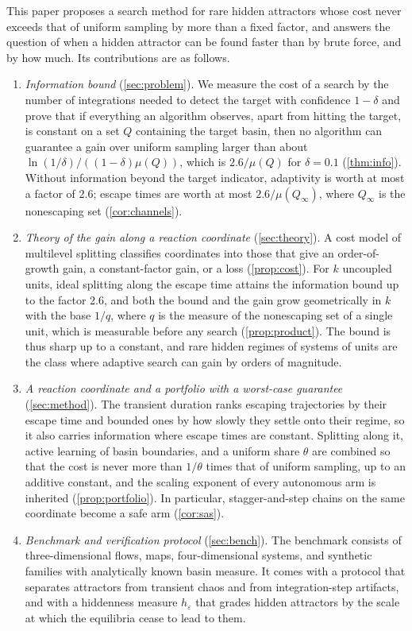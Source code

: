 This paper proposes a search method for rare hidden attractors whose cost never exceeds that of uniform sampling by more than a fixed factor, and answers the question of when a hidden attractor can be found faster than by brute force, and by how much. Its contributions are as follows.
\begin{enumerate}
\item \emph{Information bound} (\cref{sec:problem}). We measure the cost of a search by the number of integrations needed to detect the target with confidence $1-\delta$ and prove that if everything an algorithm observes, apart from hitting the target, is constant on a set $Q$ containing the target basin, then no algorithm can guarantee a gain over uniform sampling larger than about $\ln(1/\delta)/((1-\delta)\mu(Q))$, which is $2.6/\mu(Q)$ for $\delta=0.1$ (\cref{thm:info}). Without information beyond the target indicator, adaptivity is worth at most a factor of 2.6; escape times are worth at most $2.6/\mu(Q_\infty)$, where $Q_\infty$ is the nonescaping set (\cref{cor:channels}).
\item \emph{Theory of the gain along a reaction coordinate} (\cref{sec:theory}). A cost model of multilevel splitting classifies coordinates into those that give an order-of-growth gain, a constant-factor gain, or a loss (\cref{prop:cost}). For $k$ uncoupled units, ideal splitting along the escape time attains the information bound up to the factor 2.6, and both the bound and the gain grow geometrically in $k$ with the base $1/q$, where $q$ is the measure of the nonescaping set of a single unit, which is measurable before any search (\cref{prop:product}). The bound is thus sharp up to a constant, and rare hidden regimes of systems of units are the class where adaptive search can gain by orders of magnitude.
\item \emph{A reaction coordinate and a portfolio with a worst-case guarantee} (\cref{sec:method}). The transient duration ranks escaping trajectories by their escape time and bounded ones by how slowly they settle onto their regime, so it also carries information where escape times are constant. Splitting along it, active learning of basin boundaries, and a uniform share $\theta$ are combined so that the cost is never more than $1/\theta$ times that of uniform sampling, up to an additive constant, and the scaling exponent of every autonomous arm is inherited (\cref{prop:portfolio}). In particular, stagger-and-step chains on the same coordinate become a safe arm (\cref{cor:sas}).
\item \emph{Benchmark and verification protocol} (\cref{sec:bench}). The benchmark consists of three-dimensional flows, maps, four-dimensional systems, and synthetic families with analytically known basin measure. It comes with a protocol that separates attractors from transient chaos and from integration-step artifacts, and with a hiddenness measure $h_\varepsilon$ that grades hidden attractors by the scale at which the equilibria cease to lead to them.

\end{enumerate}
